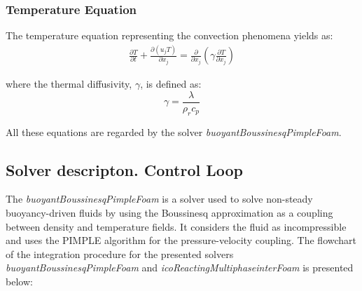 \subsubsection{Temperature Equation}
The temperature equation representing the convection phenomena yields as:
\begin{equation}
	\begin{aligned}
	\frac{\partial T}{\partial t}+ \frac{\partial (u_{j} T)}{\partial x_{j}}=\frac{\partial}{\partial x_{j}}\left(\gamma \frac{\partial T}{\partial x_{j}}\right)
	\end{aligned}
	\label{3.11}
\end{equation}

where the thermal diffusivity, $\gamma$, is defined as:
\begin{equation}
	\gamma=\frac{\lambda}{\rho_{r} c_{p}}
	\label{3.12}
\end{equation}

All these equations are regarded by the solver \textit{buoyantBoussinesqPimpleFoam}.
\subsection{Solver descripton. Control Loop}
The \textit{buoyantBoussinesqPimpleFoam} is a solver used to solve non-steady buoyancy-driven fluids by using the Boussinesq approximation as a coupling between density and temperature fields. It considers the fluid as incompressible and uses the PIMPLE algorithm for the pressure-velocity coupling. The flowchart of the integration procedure for the presented solvers \textit{buoyantBoussinesqPimpleFoam} and \textit{icoReactingMultiphaseinterFoam} is presented below:

